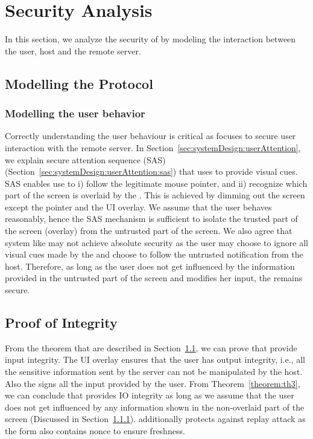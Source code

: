 \section{Security Analysis}
\label{sec:securityAnalysis}

In this section, we analyze the security of \name by modeling the interaction between the user, host and the remote server.


\subsection{Modelling the Protocol}
\label{sec:securityAnalysis:modelling}

\subsubsection{Modelling the user behavior}
\label{sec:securityAnalysis:modelling:user}

Correctly understanding the user behaviour is critical as \name focuses to secure user interaction with the remote server. In Section~\ref{sec:systemDesign:userAttention}, we explain secure attention sequence (SAS) (Section~\ref{sec:systemDesign:userAttention:sas}) that \name uses to provide visual cues. SAS enables use to i) follow the legitimate mouse pointer, and ii) recognize which part of the screen is overlaid by the \device. This is achieved by dimming out the screen except the pointer and the UI overlay. We assume that the user behaves reasonably, hence the SAS mechanism is sufficient to isolate the trusted part of the screen (\device overlay) from the untrusted part of the screen. We also agree that system like \name may not achieve absolute security as the user may choose to ignore all visual cues made by the \device and choose to follow the untrusted notification from the host. Therefore, as long as the user does not get influenced by the information provided in the untrusted part of the screen and modifies her input, the \name remains secure.


\subsection{Proof of Integrity}
\label{sec:securityAnalysis:integrity}

From the theorem that are described in Section~\ref{sec:securityAnalysis:modelling}, we can prove that \name provide input integrity. The UI overlay ensures that the user has output integrity, i.e., all the sensitive information sent by the server can not be manipulated by the host. Also the \device signs all the input provided by the user. From Theorem~\ref{theorem:th3}, we can conclude that \name provides IO integrity as long as we assume that the user does not get influenced by any information shown in the non-overlaid part of the screen (Discussed in Section~\ref{sec:securityAnalysis:modelling:user}). \name additionally protects against replay attack as the form also contains nonce to ensure freshness.  

